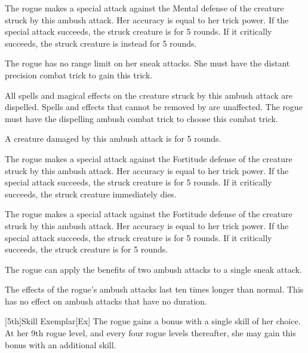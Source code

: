 The rogue makes a special attack against the Mental defense of the creature struck by this ambush attack.
Her accuracy is equal to her trick power.
If the special attack succeeds, the struck creature is \disoriented for 5 rounds.
If it critically succeeds, the struck creature is instead \confused for 5 rounds.

The rogue has no range limit on her sneak attacks.
She must have the distant precision combat trick to gain this trick.

All spells and magical effects on the creature struck by this ambush attack are dispelled.
Spells and effects that cannot be removed by  are unaffected.
The rogue must have the dispelling ambush combat trick to choose this combat trick.

A creature damaged by this ambush attack is \dazed for 5 rounds.

The rogue makes a special attack against the Fortitude defense of the creature struck by this ambush attack.
Her accuracy is equal to her trick power.
If the special attack succeeds, the struck creature is \staggered for 5 rounds.
If it critically succeeds, the struck creature immediately dies.

The rogue makes a special attack against the Fortitude defense of the creature struck by this ambush attack.
Her accuracy is equal to her trick power.
If the special attack succeeds, the struck creature is \staggered for 5 rounds.
If it critically succeeds, the struck creature is \paralyzed for 5 rounds.


The rogue can apply the benefits of two ambush attacks to a single sneak attack.

The effects of the rogue's ambush attacks last ten times longer than normal.
This has no effect on ambush attacks that have no duration.

[5th]{Skill Exemplar}[Ex]
The rogue gains a  bonus with a single skill of her choice.
At her 9th rogue level, and every four rogue levels thereafter, she may gain this bonus with an additional skill.

